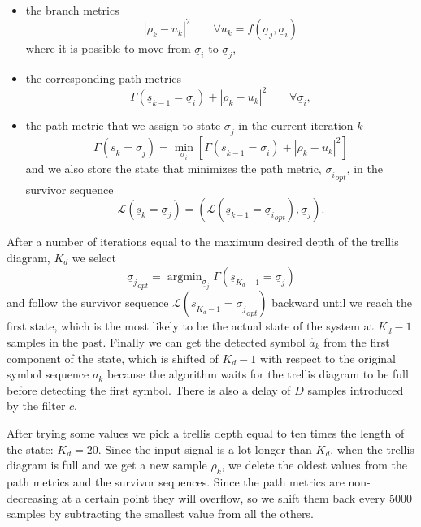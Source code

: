 \documentclass[a4paper,oneside]{article}
\renewcommand{\vec}[1]{\underline{#1}}
\newcommand{\abs}[1]{\left|#1\right|}
\DeclareMathOperator*{\argmin}{argmin}
\newcommand{\vsigma}[0]{\vec{\sigma}}
\begin{document}
\begin{itemize}
\item the branch metrics
  \begin{equation}
    \abs{\rho_k - u_k}^2 \qquad \forall u_k = f(\vsigma_j,\vsigma_i)
  \end{equation}
    where it is possible to move from $\vsigma_i$ to $\vsigma_j$,
  \item the corresponding path metrics
    \begin{equation}
      \Gamma(\vec{s}_{k-1} = \vec{\sigma}_i) + \abs{\rho_k - u_k}^2 \qquad \forall \vsigma_i ,
    \end{equation}
  \item the path metric that we assign to state $\vsigma_j$ in the
    current iteration $k$
    \begin{equation}
      \Gamma(\vec{s}_k = \vec{\sigma}_j) = \min_{\vsigma_i} \left[ \Gamma(\vec{s}_{k-1} = \vec{\sigma}_i) + \abs{\rho_k - u_k}^2 \right]
    \end{equation}
    and we also store the state that minimizes the path metric,
    ${\vsigma_i}_{opt}$, in the survivor sequence
    \begin{equation}
      \mathcal{L}(\vec{s}_k = \vsigma_j) = (\mathcal{L}(\vec{s}_{k-1} = {\vsigma_i}_{opt}), \vsigma_j) .
    \end{equation}
\end{itemize}
After a number of iterations equal to the maximum desired depth of the
trellis diagram, $K_d$ we select
\begin{equation}
  {\vsigma_j}_{opt} = \argmin_{\vsigma_j} \Gamma(\vec{s}_{K_d-1} = \vec{\sigma}_j)
\end{equation}
and follow the survivor sequence $\mathcal{L}(\vec{s}_{K_d-1} =
{\vsigma_j}_{opt})$ backward until we reach the first state, which is
the most likely to be the actual state of the system at $K_d-1$
samples in the past. Finally we can get the detected symbol
$\hat{a}_{k}$ from the first component of the state, which is shifted
of $K_d-1$ with respect to the original symbol sequence $a_k$ because
the algorithm waits for the trellis diagram to be full before
detecting the first symbol. There is also a delay of $D$ samples
introduced by the filter $c$.

After trying some values we pick a trellis depth equal to ten times
the length of the state: $K_d = 20$. Since the input signal is a lot
longer than $K_d$, when the trellis diagram is full and we get a new
sample $\rho_k$, we delete the oldest values from the path metrics and
the survivor sequences. Since the path metrics are non-decreasing at a
certain point they will overflow, so we shift them back every 5000
samples by subtracting the smallest value from all the others.
\end{document}
